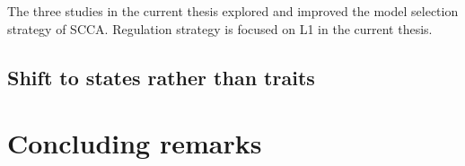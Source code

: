 The three studies in the current thesis explored and improved the model selection strategy of SCCA. Regulation strategy is focused on L1 in the current thesis.  
 
\subsection{Shift to states rather than traits}

%
%
%


\section{Concluding remarks}
\label{ch:discussion:summary}
